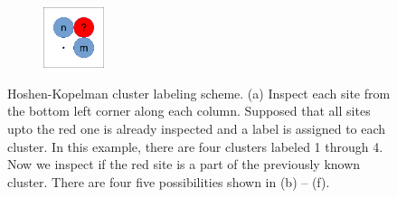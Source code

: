 \begin{figure}
\begin{subfigure}{0.15\textwidth}
		\caption{}
		\label{fig:cluster_merge1}
	\end{subfigure}
	\begin{subfigure}{0.15\textwidth}
		\centering
		\includegraphics[width=0.7in]{17.Metropolis/cluster_merge2.pdf}
		\caption{}
		\label{fig:cluster_merge2}
	\end{subfigure}
\caption{Hoshen-Kopelman cluster labeling scheme. (a) Inspect each site from the bottom left corner along each column.  Supposed that all sites upto the red one is already inspected and a label is assigned to each cluster.  In this example, there are four clusters labeled 1 through 4.  Now we inspect if the red site is a part of the previously known cluster.  There are four five possibilities shown in (b) -- (f).}
\label{fig:cluster_labeling}
\end{figure}

